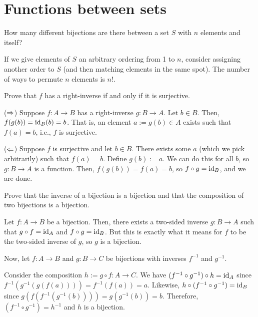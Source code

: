 \documentclass[notes,tikz]{agony}
\begin{document}
\section{Functions between sets}

\begin{xca}
  How many different bijections are there between a set $S$ with $n$ elements
  and itself?
\end{xca}
\begin{sol}
  If we give elements of $S$ an arbitrary ordering from 1 to $n$,
  consider assigning another order to $S$ (and then matching elements in the same spot).
  The number of ways to permute $n$ elements is $n!$.
\end{sol}

\begin{xca}
  Prove that $f$ has a right-inverse if and only if it is surjective.
\end{xca}
\begin{sol}
  ($\Rightarrow$) Suppose $f : A \to B$ has a right-inverse $g : B \to A$.
  Let $b \in B$. Then, $f(g(b)) = \operatorname{id}_B(b) = b$.
  That is, an element $a := g(b) \in A$ exists such that $f(a) = b$,
  i.e., $f$ is surjective.

  ($\Leftarrow$) Suppose $f$ is surjective and let $b \in B$.
  There exists some $a$ (which we pick arbitrarily) such that $f(a) = b$.
  Define $g(b) := a$.
  We can do this for all $b$, so $g : B \to A$ is a function.
  Then, $f(g(b)) = f(a) = b$, so $f \circ g = \operatorname{id}_B$, and we are done.
\end{sol}

\begin{xca}
  Prove that the inverse of a bijection is a bijection
  and that the composition of two bijections is a bijection.
\end{xca}
\begin{sol}
  Let $f : A \to B$ be a bijection.
  Then, there exists a two-sided inverse $g : B \to A$
  such that $g \circ f = \operatorname{id}_A$ and $f \circ g = \operatorname{id}_B$.
  But this is exactly what it means for $f$ to be the two-sided inverse of $g$,
  so $g$ is a bijection.

  Now, let $f : A \to B$ and $g : B \to C$ be bijections with inverses $f^{-1}$ and $g^{-1}$.

  Consider the composition $h := g \circ f : A \to C$.
  We have $(f^{-1} \circ g^{-1}) \circ h = \operatorname{id}_A$ since $f^{-1}(g^{-1}(g(f(a)))) = f^{-1}(f(a)) = a$.
  Likewise, $h \circ (f^{-1} \circ g^{-1}) = \operatorname{id}_B$ since $g(f(f^{-1}(g^{-1}(b)))) = g(g^{-1}(b)) = b$.
  Therefore, $(f^{-1} \circ g^{-1}) = h^{-1}$ and $h$ is a bijection.
\end{sol}
\end{document}
